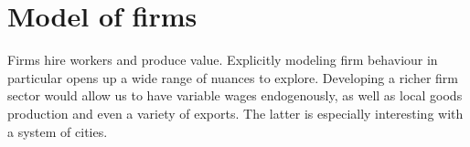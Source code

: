 








\section{Model of firms}

Firms hire workers and produce value. Explicitly modeling firm behaviour in particular opens up a wide range of nuances to explore. Developing a richer firm sector would allow us to have variable wages endogenously, as well as local goods production and even a variety of exports. The latter is especially interesting with a system of cities. %


